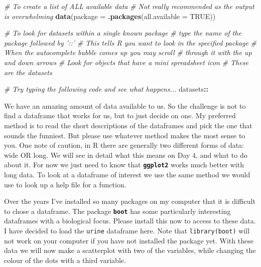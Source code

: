 \documentclass[]{book}
\newenvironment{Shaded}{\begin{snugshade}}{\end{snugshade}}
\newcommand{\KeywordTok}[1]{\textcolor[rgb]{0.13,0.29,0.53}{\textbf{#1}}}
\newcommand{\DataTypeTok}[1]{\textcolor[rgb]{0.13,0.29,0.53}{#1}}
\newcommand{\CommentTok}[1]{\textcolor[rgb]{0.56,0.35,0.01}{\textit{#1}}}
\newcommand{\OtherTok}[1]{\textcolor[rgb]{0.56,0.35,0.01}{#1}}
\newcommand{\OperatorTok}[1]{\textcolor[rgb]{0.81,0.36,0.00}{\textbf{#1}}}
\newcommand{\NormalTok}[1]{#1}
\theoremstyle{definition}
\theoremstyle{definition}
\theoremstyle{definition}
\theoremstyle{remark}
\begin{document}
\begin{Shaded}
\begin{Highlighting}[]
\CommentTok{# To create a list of ALL available data}
  \CommentTok{# Not really recommended as the output is overwhelming}
\KeywordTok{data}\NormalTok{(}\DataTypeTok{package =} \KeywordTok{.packages}\NormalTok{(}\DataTypeTok{all.available =} \OtherTok{TRUE}\NormalTok{))}

\CommentTok{# To look for datasets within a single known package}
  \CommentTok{# type the name of the package followed by '::'}
  \CommentTok{# This tells R you want to look in the specified package}
  \CommentTok{# When the autocomplete bubble comes up you may scroll}
  \CommentTok{# through it with the up and down arrows}
  \CommentTok{# Look for objects that have a mini spreadsheet icon}
  \CommentTok{# These are the datasets}

\CommentTok{# Try typing the following code and see what happens...}
\NormalTok{datasets}\OperatorTok{::}
\end{Highlighting}
\end{Shaded}

We have an amazing amount of data available to us. So the challenge is
not to find a dataframe that works for us, but to just decide on one. My
preferred method is to read the short descriptions of the dataframes and
pick the one that sounds the funniest. But please use whatever method
makes the most sense to you. One note of caution, in R there are
generally two different forms of data: wide OR long. We will see in
detail what this means on Day 4, and what to do about it. For now we
just need to know that \textbf{\texttt{ggplot2}} works much better with
long data. To look at a dataframe of interest we use the same method we
would use to look up a help file for a function.

Over the years I've installed so many packages on my computer that it is
difficult to chose a dataframe. The package \textbf{\texttt{boot}} has
some particularly interesting dataframes with a biological focus. Please
install this now to access to these data. I have decided to load the
\texttt{urine} dataframe here. Note that \texttt{library(boot)} will not
work on your computer if you have not installed the package yet. With
these data we will now make a scatterplot with two of the variables,
while changing the colour of the dots with a third variable.
\end{document}
